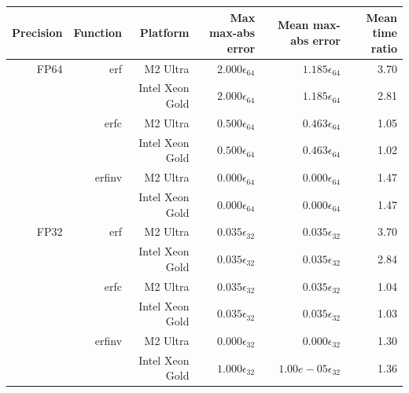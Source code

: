 \begin{tabular}{|r|r|r|r|r|r|}
  \hline
  \textbf{Precision} & \textbf{Function} & \textbf{Platform} & \textbf{Max max-abs error} & \textbf{Mean max-abs error} & \textbf{Mean time ratio} \\
  \hline
  FP64 & erf & M2 Ultra & $2.000 \epsilon_{64}$ & $1.185 \epsilon_{64}$ & 3.70 \\
   &  & Intel Xeon Gold & $2.000 \epsilon_{64}$ & $1.185 \epsilon_{64}$ & 2.81 \\
   & erfc & M2 Ultra & $0.500 \epsilon_{64}$ & $0.463 \epsilon_{64}$ & 1.05 \\
   &  & Intel Xeon Gold & $0.500 \epsilon_{64}$ & $0.463 \epsilon_{64}$ & 1.02 \\
   & erfinv & M2 Ultra & $0.000 \epsilon_{64}$ & $0.000 \epsilon_{64}$ & 1.47 \\
   &  & Intel Xeon Gold & $0.000 \epsilon_{64}$ & $0.000 \epsilon_{64}$ & 1.47 \\
  FP32 & erf & M2 Ultra & $0.035 \epsilon_{32}$ & $0.035 \epsilon_{32}$ & 3.70 \\
   &  & Intel Xeon Gold & $0.035 \epsilon_{32}$ & $0.035 \epsilon_{32}$ & 2.84 \\
   & erfc & M2 Ultra & $0.035 \epsilon_{32}$ & $0.035 \epsilon_{32}$ & 1.04 \\
   &  & Intel Xeon Gold & $0.035 \epsilon_{32}$ & $0.035 \epsilon_{32}$ & 1.03 \\
   & erfinv & M2 Ultra & $0.000 \epsilon_{32}$ & $0.000 \epsilon_{32}$ & 1.30 \\
   &  & Intel Xeon Gold & $1.000 \epsilon_{32}$ & $1.00e-05 \epsilon_{32}$ & 1.36 \\
  \hline
\end{tabular}
